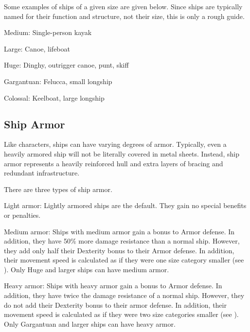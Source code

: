         Some examples of ships of a given size are given below.
        Since ships are typically named for their function and structure, not their size, this is only a rough guide.
        \begin{raggeditemize}
            \item Medium: Single-person kayak
            \item Large: Canoe, lifeboat
            \item Huge: Dinghy, outrigger canoe, punt, skiff
            \item Gargantuan: Felucca, small longship
            \item Colossal: Keelboat, large longship
        \end{raggeditemize}

    \subsection{Ship Armor}
        Like characters, ships can have varying degrees of armor.
        Typically, even a heavily armored ship will not be literally covered in metal sheets.
        Instead, ship armor represents a heavily reinforced hull and extra layers of bracing and redundant infrastructure.

        There are three types of ship armor.
        \begin{raggeditemize}
            \item Light armor: Lightly armored ships are the default. They gain no special benefits or penalties.
            \item Medium armor: Ships with medium armor gain a  bonus to Armor defense.
                In addition, they have 50\% more damage resistance than a normal ship.
                However, they add only half their Dexterity bonus to their Armor defense.
                In addition, their movement speed is calculated as if they were one size category smaller (see ).
                Only Huge and larger ships can have medium armor.
            \item Heavy armor: Ships with heavy armor gain a  bonus to Armor defense.
                In addition, they have twice the damage resistance of a normal ship.
                However, they do not add their Dexterity bonus to their armor defense.
                In addition, their movement speed is calculated as if they were two size categories smaller (see ).
                Only Gargantuan and larger ships can have heavy armor.
        \end{raggeditemize}

